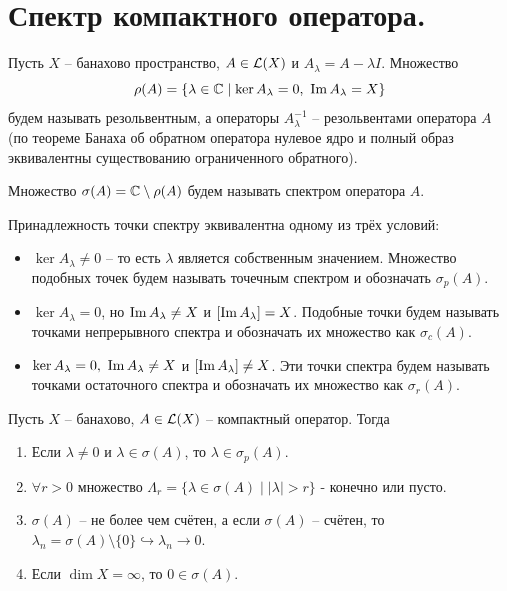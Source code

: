 \section{Спектр компактного оператора.}\label{seq:compact_spectrum}
\begin{definition}
    Пусть $X$ -- банахово пространство, $A \in \mathcal{L}(X)$ и $A_\lambda = A - \lambda I$.
    Множество
    \[
        \rho(A) = \{\lambda \in \mathbb{C} \mid \ker A_\lambda = 0, \ \operatorname{Im} A_\lambda = X\}
    \]
    будем называть резольвентным, а операторы $A_\lambda^{-1}$ -- резольвентами оператора $A$ (по теореме Банаха об обратном оператора нулевое ядро и полный образ эквивалентны существованию ограниченного обратного).

    Множество $\sigma(A) = \mathbb{C} \setminus \rho(A)$ будем называть спектром оператора $A$.
\end{definition}
\begin{note}
    Принадлежность точки спектру эквивалентна одному из трёх условий:
    \begin{itemize}
        \item $\ker A_\lambda \neq 0$ -- то есть $\lambda$ является собственным значением. Множество подобных точек будем называть точечным спектром и обозначать $\sigma_p(A)$.
        \item $\ker A_\lambda = 0$, но $\operatorname{Im} A_\lambda \neq X$ и $[\operatorname{Im} A_\lambda] = X$. Подобные точки будем называть точками непрерывного спектра и обозначать их множество как $\sigma_c(A)$.
        \item $\ker A_\lambda = 0, \ \operatorname{Im} A_\lambda \neq X$ и $[\operatorname{Im} A_\lambda] \neq X$. Эти точки спектра будем называть точками остаточного спектра и обозначать их множество как $\sigma_r(A)$.
    \end{itemize}
\end{note}
\begin{theorem}
    Пусть $X$ -- банахово, $A \in \mathcal{L}(X)$ -- компактный оператор.
    Тогда
    \begin{enumerate}
        \item Если $\lambda \neq 0$ и $\lambda \in \sigma(A)$, то $\lambda \in \sigma_p(A)$.
        \item $\forall r > 0$ множество $\Lambda_r = \{\lambda \in \sigma(A) \mid |\lambda| > r\}$ - конечно или пусто.
        \item $\sigma(A)$ -- не более чем счётен, а если $\sigma(A)$ -- счётен, то $\lambda_n = \sigma(A) \setminus \{0\} \hookrightarrow \lambda_n \rightarrow 0$. 
        \item Если $\dim X = \infty$, то $0 \in \sigma(A)$.
    \end{enumerate}
\end{theorem}
